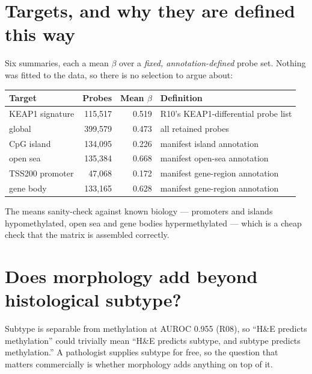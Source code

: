 \documentclass[11pt,a4paper]{article}
\begin{document}
\section{Targets, and why they are defined this way}

Six summaries, each a mean $\beta$ over a \emph{fixed, annotation-defined} probe set. Nothing was
fitted to the data, so there is no selection to argue about:

\begin{center}
\begin{tabular}{@{}lrrl@{}}
\toprule
\textbf{Target} & \textbf{Probes} & \textbf{Mean $\beta$} & \textbf{Definition} \\
\midrule
KEAP1 signature & 115{,}517 & 0.519 & R10's KEAP1-differential probe list \\
global & 399{,}579 & 0.473 & all retained probes \\
CpG island & 134{,}095 & 0.226 & manifest island annotation \\
open sea & 135{,}384 & 0.668 & manifest open-sea annotation \\
TSS200 promoter & \phantom{0}47{,}068 & 0.172 & manifest gene-region annotation \\
gene body & 133{,}165 & 0.628 & manifest gene-region annotation \\
\bottomrule
\end{tabular}
\end{center}

The means sanity-check against known biology --- promoters and islands hypomethylated, open sea
and gene bodies hypermethylated --- which is a cheap check that the matrix is assembled correctly.

\section{Does morphology add beyond histological subtype?}

Subtype is separable from methylation at AUROC 0.955 (R08), so ``H\&E predicts methylation''
could trivially mean ``H\&E predicts subtype, and subtype predicts methylation.'' A pathologist
supplies subtype for free, so the question that matters commercially is whether morphology adds
anything on top of it.
\end{document}
